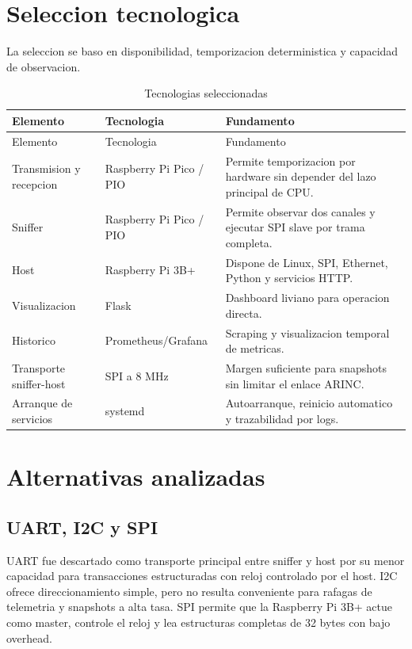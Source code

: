 \documentclass[12pt,a4paper,oneside]{report}
\begin{document}
\section{Seleccion tecnologica}

La seleccion se baso en disponibilidad, temporizacion deterministica y
capacidad de observacion.

\begin{longtable}{p{}p{}p{}}
\caption{Tecnologias seleccionadas}\\
\toprule
Elemento & Tecnologia & Fundamento \\
\midrule
\endfirsthead
\toprule
Elemento & Tecnologia & Fundamento \\
\midrule
\endhead
Transmision y recepcion & Raspberry Pi Pico / PIO & Permite temporizacion por hardware sin depender del lazo principal de CPU. \\
Sniffer & Raspberry Pi Pico / PIO & Permite observar dos canales y ejecutar SPI slave por trama completa. \\
Host & Raspberry Pi 3B+ & Dispone de Linux, SPI, Ethernet, Python y servicios HTTP. \\
Visualizacion & Flask & Dashboard liviano para operacion directa. \\
Historico & Prometheus/Grafana & Scraping y visualizacion temporal de metricas. \\
Transporte sniffer-host & SPI a 8 MHz & Margen suficiente para snapshots sin limitar el enlace ARINC. \\
Arranque de servicios & systemd & Autoarranque, reinicio automatico y trazabilidad por logs. \\
\bottomrule
\end{longtable}

\section{Alternativas analizadas}

\subsection{UART, I2C y SPI}

UART fue descartado como transporte principal entre sniffer y host por su menor
capacidad para transacciones estructuradas con reloj controlado por el host.
I2C ofrece direccionamiento simple, pero no resulta conveniente para rafagas de
telemetria y snapshots a alta tasa. SPI permite que la Raspberry Pi 3B+ actue
como master, controle el reloj y lea estructuras completas de 32 bytes con bajo
overhead.
\end{document}
